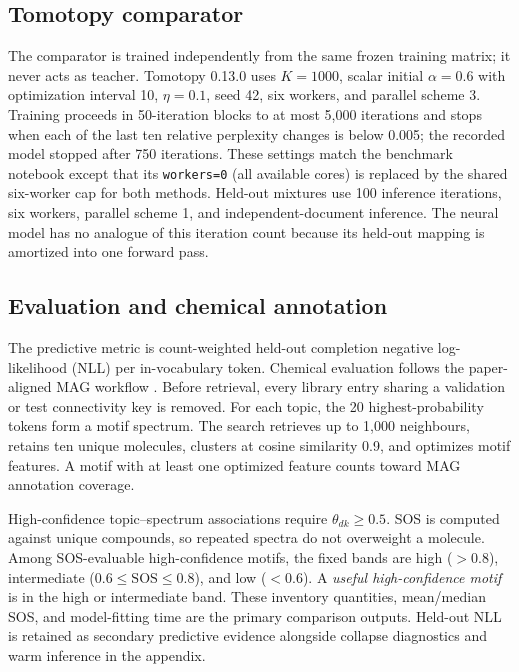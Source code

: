 \documentclass[10pt,a4paper]{article}
\begin{document}
\subsection{Tomotopy comparator}

The comparator is trained independently from the same frozen training matrix;
it never acts as teacher. Tomotopy 0.13.0 \cite{tomotopy} uses $K=1000$,
scalar initial
$\alpha=0.6$ with optimization interval 10, $\eta=0.1$, seed 42, six workers,
and parallel scheme 3. Training proceeds in 50-iteration blocks to at most
5,000 iterations and stops when each of the last ten relative perplexity
changes is below 0.005; the recorded model stopped after 750 iterations.
These settings match the benchmark notebook except that its
\texttt{workers=0} (all available cores) is replaced by the shared six-worker
cap for both methods.
Held-out mixtures use 100 inference iterations, six workers, parallel scheme 1,
and independent-document inference. The neural model has no analogue of this
iteration count because its held-out mapping is amortized into one forward pass.

\subsection{Evaluation and chemical annotation}

The predictive metric is count-weighted held-out completion negative
log-likelihood (NLL) per in-vocabulary token. Chemical evaluation follows the
paper-aligned MAG workflow \cite{torresortega2026}. Before retrieval, every
library entry sharing a validation or test connectivity key is removed. For
each topic, the 20 highest-probability tokens form a motif spectrum. The search
retrieves up to 1,000 neighbours, retains ten unique molecules, clusters at
cosine similarity 0.9, and optimizes motif features. A motif with at least one
optimized feature counts toward MAG annotation coverage.

High-confidence topic--spectrum associations require $\theta_{dk}\geq0.5$.
SOS is computed against unique compounds, so repeated spectra do not
overweight a molecule. Among SOS-evaluable high-confidence motifs, the fixed
bands are high ($>0.8$), intermediate ($0.6\leq\mathrm{SOS}\leq0.8$), and low
($<0.6$). A \emph{useful high-confidence motif} is in the high or intermediate
band. These inventory quantities, mean/median SOS, and model-fitting time are
the primary comparison outputs. Held-out NLL is retained as secondary
predictive evidence alongside collapse diagnostics and warm inference in the
appendix.
\end{document}
